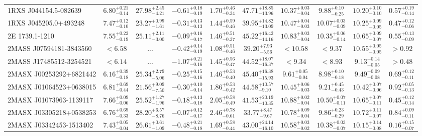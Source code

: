 \documentclass[onecolumn]{mn2e}
\begin{document}
\begin{landscape}
{\begin{center}
\begin{longtable}{lccccccccc}
\hline \hline
\endfoot
1RXS J044154.5-082639 & $6.80_{-0.14}^{+0.21}$ & $27.98_{-4.21}^{+2.45}$ & $-0.61_{-0.19}^{+0.18}$ & $1.70_{-0.34}^{+0.46}$ &$47.71_{-13.96}^{+18.85}$ & $10.37_{-0.04}^{+0.03}$ & $9.88_{-0.25}^{+0.10}$ & $10.20_{-0.10}^{+0.10}$ & $0.57_{-0.14}^{+0.19}$ \\
1RXS J045205.0+493248 & $7.47_{-0.10}^{+0.12}$ & $23.27_{-1.61}^{+0.99}$ & $-0.31_{-0.13}^{+0.13}$ & $1.44_{-0.46}^{+0.59}$ &$39.95_{-13.09}^{+14.82}$ & $10.47_{-0.03}^{+0.04}$ & $10.07_{-0.09}^{+0.03}$ & $10.25_{-0.05}^{+0.09}$ & $0.47_{-0.06}^{+0.12}$ \\
2E 1739.1-1210 & $7.55_{-0.19}^{+0.22}$ & $25.11_{-3.00}^{+2.11}$ & $-0.09_{-0.17}^{+0.16}$ & $1.46_{-0.37}^{+0.51}$ &$45.22_{-14.16}^{+16.42}$ & $10.83_{-0.04}^{+0.03}$ & $10.35_{-0.14}^{+0.06}$ & $10.65_{-0.07}^{+0.09}$ & $0.55_{-0.09}^{+0.13}$ \\
2MASS J07594181-3843560 & $<6.58$ & ... & $-0.42_{-0.19}^{+0.14}$ & $1.08_{-0.46}^{+0.51}$ &$39.20_{-5.56}^{+7.93}$ & $<10.58$ & $<9.37$ & $10.55_{-0.05}^{+0.05}$ & $>0.92$ \\
2MASS J17485512-3254521 & $<6.14$ & ... & $-1.07_{-0.16}^{+0.21}$ & $1.45_{-0.47}^{+0.56}$ &$44.52_{-16.37}^{+18.07}$ & $<9.34$ & $<8.93$ & $9.13_{-0.05}^{+0.14}$ & $>0.48$ \\
2MASX J00253292+6821442 & $6.16_{-0.18}^{+0.39}$ & $25.34_{-5.06}^{+2.79}$ & $-0.25_{-0.16}^{+0.15}$ & $1.46_{-0.40}^{+0.53}$ &$45.40_{-15.93}^{+16.38}$ & $9.61_{-0.04}^{+0.05}$ & $8.98_{-0.18}^{+0.10}$ & $9.49_{-0.08}^{+0.09}$ & $0.69_{-0.11}^{+0.12}$ \\
2MASX J01064523+0638015 & $6.81_{-0.44}^{+0.69}$ & $21.56_{-7.50}^{+9.09}$ & $-0.30_{-0.14}^{+0.10}$ & $1.86_{-0.42}^{+0.53}$ &$44.58_{-9.10}^{+10.57}$ & $10.45_{-0.03}^{+0.06}$ & $9.21_{-0.43}^{+0.45}$ & $10.42_{-0.06}^{+0.07}$ & $0.92_{-0.13}^{+0.05}$ \\
2MASX J01073963-1139117 & $7.66_{-0.06}^{+0.09}$ & $25.52_{-1.96}^{+1.27}$ & $-0.18_{-0.18}^{+0.13}$ & $2.05_{-0.49}^{+0.58}$ &$41.53_{-10.35}^{+20.19}$ & $10.88_{-0.04}^{+0.02}$ & $10.50_{-0.11}^{+0.07}$ & $10.65_{-0.11}^{+0.07}$ & $0.45_{-0.14}^{+0.12}$ \\
2MASX J03305218+0538253 & $6.76_{-0.33}^{+0.69}$ & $28.20_{-8.76}^{+6.57}$ & $-0.07_{-0.17}^{+0.12}$ & $2.46_{-0.61}^{+0.78}$ &$33.77_{-9.67}^{+8.47}$ & $10.78_{-0.04}^{+0.09}$ & $9.86_{-0.29}^{+0.23}$ & $10.72_{-0.07}^{+0.11}$ & $0.84_{-0.11}^{+0.09}$ \\
2MASX J03342453-1513402 & $7.43_{-0.04}^{+0.05}$ & $26.61_{-1.09}^{+0.61}$ & $-0.48_{-0.18}^{+0.21}$ & $1.69_{-0.44}^{+0.58}$ &$43.00_{-16.10}^{+24.14}$ & $10.58_{-0.02}^{+0.03}$ & $10.38_{-0.07}^{+0.03}$ & $10.15_{-0.08}^{+0.14}$ & $0.16_{-0.07}^{+0.15}$ \\

\end{longtable}
\end{center}}
\end{landscape}
\end{document}
